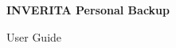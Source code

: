 %
%
%
%


\begin{titlepage} 

\begin{center}
\end{center}

\vspace{5cm}

\begin{center}
  \textbf{\Huge{INVERITA Personal Backup}}
\end{center}

\begin{center}
  \huge{User Guide}
\end{center}

\vspace{1cm}

\begin{center}
  \version
\end{center}

\end{titlepage}
